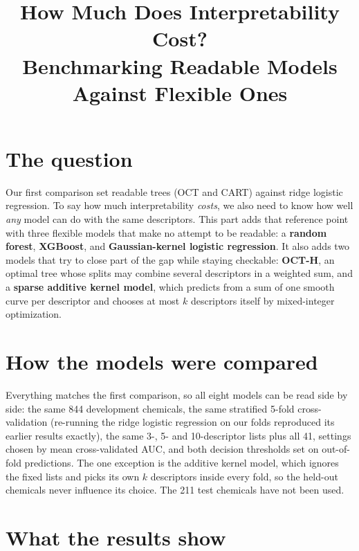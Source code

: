 \documentclass[11pt]{article}
\title{How Much Does Interpretability Cost?\\[2pt] \large Benchmarking Readable Models Against Flexible Ones}
\author{\todo{Team names}}
\date{\todo{Date}}
\begin{document}
\maketitle

\section*{The question}

Our first comparison set readable trees (OCT and CART) against ridge logistic regression. To say how
much interpretability \emph{costs}, we also need to know how well \emph{any} model can do with the
same descriptors. This part adds that reference point with three flexible models that make no
attempt to be readable: a \textbf{random forest}, \textbf{XGBoost}, and \textbf{Gaussian-kernel
logistic regression}. It also adds two models that try to close part of the gap while staying
checkable: \textbf{OCT-H}, an optimal tree whose splits may combine several descriptors in a
weighted sum, and a \textbf{sparse additive kernel model}, which predicts from a sum of one smooth
curve per descriptor and chooses at most $k$ descriptors itself by mixed-integer optimization.

\section*{How the models were compared}

Everything matches the first comparison, so all eight models can be read side by side: the same
844 development chemicals, the same stratified 5-fold cross-validation (re-running the ridge
logistic regression on our folds reproduced its earlier results exactly), the same 3-, 5- and
10-descriptor lists plus all 41, settings chosen by mean cross-validated AUC, and both decision
thresholds set on out-of-fold predictions. The one exception is the additive kernel model, which
ignores the fixed lists and picks its own $k$ descriptors inside every fold, so the held-out
chemicals never influence its choice. The 211 test chemicals have not been used.

\section*{What the results show}
\end{document}
